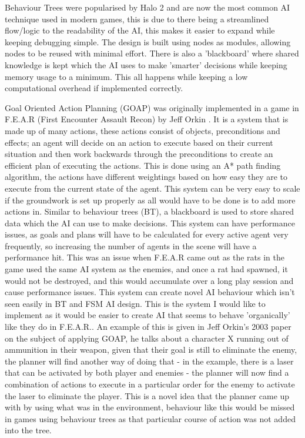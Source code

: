 \documentclass[11pt]{report}
\begin{document}
Behaviour Trees were popularised by Halo 2\cite{halo2} and are now the most common AI technique used in modern games, this is due to there being a streamlined flow/logic to the readability of the AI, this makes it easier to expand while keeping debugging simple. The design is built using nodes as modules, allowing nodes to be reused with minimal effort. There is also a 'blackboard' where shared knowledge is kept which the AI uses to make 'smarter' decisions while keeping memory usage to a minimum. This all happens while keeping a low computational overhead if implemented correctly. \cite{behaviourTrees}

Goal Oriented Action Planning (GOAP) was originally implemented in a game in F.E.A.R (First Encounter Assault Recon) by Jeff Orkin \cite{goap}. It is a system that is made up of many actions, these actions consist of objects, preconditions and effects; an agent will decide on an action to execute based on their current situation and then work backwards through the preconditions to create an efficient plan of executing the actions. This is done using an A* path finding algorithm, the actions have different weightings based on how easy they are to execute from the current state of the agent. This system can be very easy to scale if the groundwork is set up properly as all would have to be done is to add more actions in. Similar to behaviour trees (BT), a blackboard is used to store shared data which the AI can use to make decisions. This system can have performance issues, as goals and plans will have to be calculated for every active agent very frequently, so increasing the number of agents in the scene will have a performance hit. This was an issue when F.E.A.R came out as the rats in the game used the same AI system as the enemies, and once a rat had spawned, it would not be destroyed, and this would accumulate over a long play session and cause performance issues.
This system can create novel AI behaviour which isn't seen easily in BT and FSM AI design. This is the system I would like to implement as it would be easier to create AI that seems to behave 'organically' like they do in F.E.A.R.. \cite{goapTommyTompson} An example of this is given in Jeff Orkin's 2003 paper on the subject of applying GOAP\cite{applyingGoap}, he talks about a character X running out of ammunition in their weapon, given that their goal is still to eliminate the enemy, the planner will find another way of doing that - in the example, there is a laser that can be activated by both player and enemies - the planner will now find a combination of actions to execute in a particular order for the enemy to activate the laser to eliminate the player. This is a novel idea that the planner came up with by using what was in the environment, behaviour like this would be missed in games using behaviour trees as that particular course of action was not added into the tree.
\end{document}
